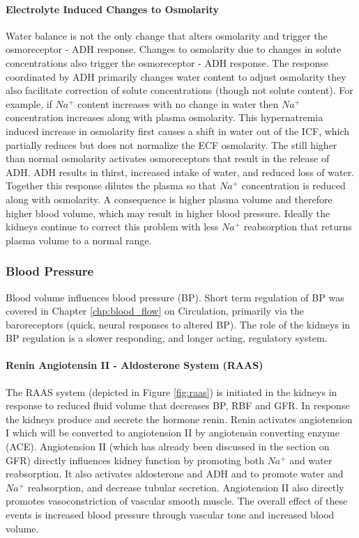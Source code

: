 \paragraph{Electrolyte Induced Changes to Osmolarity}
Water balance is not the only change that alters osmolarity and trigger the osmoreceptor - ADH response. Changes to osmolarity due to changes in solute concentrations also trigger the osmoreceptor - ADH response. The response coordinated by ADH primarily changes water content to adjust osmolarity they also facilitate correction of solute concentrations (though not solute content). For example, if $Na^+$ content increases with no change in water then $Na^+$ concentration increases along with plasma osmolarity. This hypernatremia induced increase in osmolarity first causes a shift in water out of the ICF, which partially reduces but does not normalize the ECF osmolarity. The still higher than normal osmolarity activates osmoreceptors that result in the release of ADH. ADH results in thirst, increased intake of water, and reduced loss of water. Together this response dilutes the plasma so that $Na^+$ concentration is reduced along with osmolarity. A consequence is higher plasma volume and therefore higher blood volume, which may result in higher blood pressure. Ideally the kidneys continue to correct this problem with less $Na^+$ reabsorption that returns plasma volume to a normal range.

\subsubsection{Blood Pressure}

Blood volume influences blood pressure (BP). Short term regulation of BP was covered in Chapter \ref{chp:blood_flow} on Circulation, primarily via the baroreceptors (quick, neural responses to altered BP). The role of the kidneys in BP regulation is a slower responding, and longer acting, regulatory system.

\paragraph{Renin Angiotensin II - Aldosterone System (RAAS)}

The RAAS system (depicted in Figure \ref{fig:raas}) is initiated in the kidneys in response to reduced fluid volume that decreases BP, RBF and GFR. In response the kidneys produce and secrete the hormone renin. Renin activates angiotension I which will be converted to angiotension II by angiotensin converting enzyme (ACE). Angiotension II (which has already been discussed in the section on GFR) directly influences kidney function by promoting both $Na^+$ and water reabsorption. It also activates aldosterone and ADH and to promote water and $Na^+$ reabsorption, and decrease tubular secretion. Angiotension II also directly promotes vasoconstriction of vascular smooth muscle. The overall effect of these events is increased blood pressure through vascular tone and increased blood volume.

